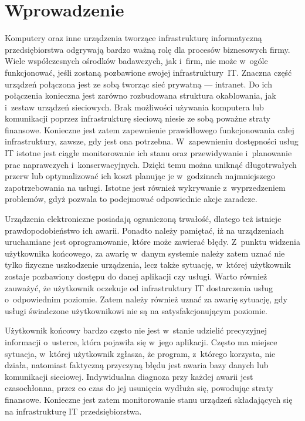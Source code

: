 \chapter{Wprowadzenie}

Komputery oraz inne urządzenia tworzące infrastrukturę informatyczną
przedsiębiorstwa odgrywają bardzo ważną rolę dla procesów biznesowych
firmy. Wiele współczesnych ośrodków badawczych, jak i~firm, nie może
w~ogóle funkcjonować, jeśli zostaną pozbawione swojej
infrastruktury~IT. Znaczna część urządzeń połączona jest ze sobą
tworząc sieć prywatną --- intranet. Do ich połączenia konieczna jest
zarówno rozbudowana struktura okablowania, jak i~zestaw urządzeń
sieciowych. Brak możliwości używania komputera lub komunikacji poprzez
infrastrukturę sieciową niesie ze sobą poważne straty
finansowe. Konieczne jest zatem zapewnienie prawidłowego
funkcjonowania całej infrastruktury, zawsze, gdy jest ona
potrzebna. W~zapewnieniu dostępności usług IT istotne jest ciągłe
monitorowanie ich stanu oraz przewidywanie i~planowanie prac
naprawczych i~konserwacyjnych. Dzięki temu można uniknąć długotrwałych
przerw lub optymalizować ich koszt planując je w~godzinach
najmniejszego zapotrzebowania na usługi. Istotne jest również
wykrywanie z~wyprzedzeniem problemów, gdyż pozwala to podejmować
odpowiednie akcje zaradcze.

Urządzenia elektroniczne posiadają ograniczoną trwałość, dlatego też
istnieje prawdopodobieństwo ich awarii. Ponadto należy pamiętać, iż na
urządzeniach uruchamiane jest oprogramowanie, które może zawierać
błędy. Z~punktu widzenia użytkownika końcowego, za awarię w~danym
systemie należy zatem uznać nie tylko fizyczne uszkodzenie urządzenia,
lecz także sytuację, w~której użytkownik zostaje pozbawiony dostępu do
danej aplikacji czy usługi. Warto również zauważyć, że użytkownik
oczekuje od infrastruktury IT dostarczenia usług o~odpowiednim
poziomie. Zatem należy również uznać za awarię sytuację, gdy usługi
świadczone użytkownikowi nie są na satysfakcjonującym poziomie.

Użytkownik końcowy bardzo często nie jest w~stanie udzielić
precyzyjnej informacji o~usterce, która pojawiła się w~jego
aplikacji. Często ma miejsce sytuacja, w~której użytkownik zgłasza, że
program, z~którego korzysta, nie działa, natomiast faktyczną
przyczyną błędu jest awaria bazy danych lub komunikacji
sieciowej. Indywidualna diagnoza przy każdej awarii jest czasochłonna,
przez co czas do jej usunięcia wydłuża się, powodując straty
finansowe. Konieczne jest zatem monitorowanie stanu urządzeń
składających się na infrastrukturę IT przedsiębiorstwa.

